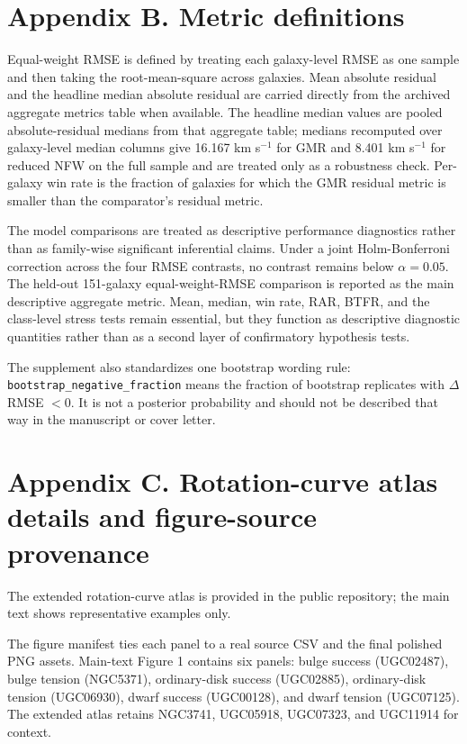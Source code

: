 \documentclass[twocolumn]{aastex701}
\begin{document}
\section{Appendix B. Metric definitions}

Equal-weight RMSE is defined by treating each galaxy-level RMSE as one sample and then taking the root-mean-square across galaxies. Mean absolute residual and the headline median absolute residual are carried directly from the archived aggregate metrics table when available. The headline median values are pooled absolute-residual medians from that aggregate table; medians recomputed over galaxy-level median columns give 16.167 km s$^{-1}$ for GMR and 8.401 km s$^{-1}$ for reduced NFW on the full sample and are treated only as a robustness check. Per-galaxy win rate is the fraction of galaxies for which the GMR residual metric is smaller than the comparator's residual metric.

The model comparisons are treated as descriptive performance diagnostics rather than as family-wise significant inferential claims. Under a joint Holm-Bonferroni correction across the four RMSE contrasts, no contrast remains below $\alpha=0.05$. The held-out 151-galaxy equal-weight-RMSE comparison is reported as the main descriptive aggregate metric. Mean, median, win rate, RAR, BTFR, and the class-level stress tests remain essential, but they function as descriptive diagnostic quantities rather than as a second layer of confirmatory hypothesis tests.

The supplement also standardizes one bootstrap wording rule: \texttt{bootstrap\_negative\_fraction} means the fraction of bootstrap replicates with $\Delta$RMSE $< 0$. It is not a posterior probability and should not be described that way in the manuscript or cover letter.



\section{Appendix C. Rotation-curve atlas details and figure-source provenance}

The extended rotation-curve atlas is provided in the public repository; the main text shows representative examples only.

The figure manifest ties each panel to a real source CSV and the final polished PNG assets. Main-text Figure 1 contains six panels: bulge success (UGC02487), bulge tension (NGC5371), ordinary-disk success (UGC02885), ordinary-disk tension (UGC06930), dwarf success (UGC00128), and dwarf tension (UGC07125). The extended atlas retains NGC3741, UGC05918, UGC07323, and UGC11914 for context.
\end{document}
